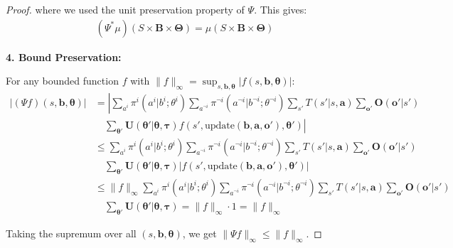 \documentclass[a4paper,12pt]{report}
\begin{document}
\begin{proof}
    where we used the unit preservation property of $\Psi$. This gives:
    \begin{align}
        (\Psi^{*}\mu)(S \times \boldsymbol{B}\times \boldsymbol{\Theta}) = \mu(S \times \boldsymbol{B}\times \boldsymbol{\Theta})
    \end{align}

    \textbf{4. Bound Preservation:}

    For any bounded function $f$ with
    $\|f\|_{\infty}= \sup_{s,\boldsymbol{b},\boldsymbol{\theta}}|f(s,\boldsymbol{b}
        ,\boldsymbol{\theta})|$:
    \begin{align}
        |(\Psi f)(s, \boldsymbol{b}, \boldsymbol{\theta})| & = \left| \sum_{a^i}\pi^{i}(a^{i}|b^{i}; \theta^{i}) \sum_{a^{\neg i}}\pi^{\neg i}(a^{\neg i}|b^{\neg i}; \theta^{\neg i}) \sum_{s'}T(s'|s, \boldsymbol{a}) \sum_{\boldsymbol{o}'}\boldsymbol{O}(\boldsymbol{o}'|s') \right.   \\
                                                           & \quad \left. \sum_{\boldsymbol{\theta}'}\boldsymbol{U}(\boldsymbol{\theta}'|\boldsymbol{\theta}, \boldsymbol{\tau}) f(s', \text{update}(\boldsymbol{b}, \boldsymbol{a}, \boldsymbol{o}'), \boldsymbol{\theta}') \right|       \\
                                                           & \leq \sum_{a^i}\pi^{i}(a^{i}|b^{i}; \theta^{i}) \sum_{a^{\neg i}}\pi^{\neg i}(a^{\neg i}|b^{\neg i}; \theta^{\neg i}) \sum_{s'}T(s'|s, \boldsymbol{a}) \sum_{\boldsymbol{o}'}\boldsymbol{O}(\boldsymbol{o}'|s')               \\
                                                           & \quad \sum_{\boldsymbol{\theta}'}\boldsymbol{U}(\boldsymbol{\theta}'|\boldsymbol{\theta}, \boldsymbol{\tau}) \left|f(s', \text{update}(\boldsymbol{b}, \boldsymbol{a}, \boldsymbol{o}'), \boldsymbol{\theta}') \right|        \\
                                                           & \leq \|f\|_{\infty}\sum_{a^i}\pi^{i}(a^{i}|b^{i}; \theta^{i}) \sum_{a^{\neg i}}\pi^{\neg i}(a^{\neg i}|b^{\neg i}; \theta^{\neg i}) \sum_{s'}T(s'|s, \boldsymbol{a}) \sum_{\boldsymbol{o}'}\boldsymbol{O}(\boldsymbol{o}'|s') \\
                                                           & \quad \sum_{\boldsymbol{\theta}'}\boldsymbol{U}(\boldsymbol{\theta}'|\boldsymbol{\theta}, \boldsymbol{\tau}) = \|f\|_{\infty}\cdot 1 = \|f\|_{\infty}
    \end{align}

    Taking the supremum over all $(s, \boldsymbol{b}, \boldsymbol{\theta})$, we get
    $\|\Psi f\|_{\infty}\leq \|f\|_{\infty}$.


\end{proof}
\end{document}
